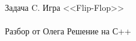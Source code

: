 {\large Задача C. Игра <<Flip-Flop>>} 
\\
\\
Разбор от Олега
\newpage
{\large Решение на С++}
\\
\\

